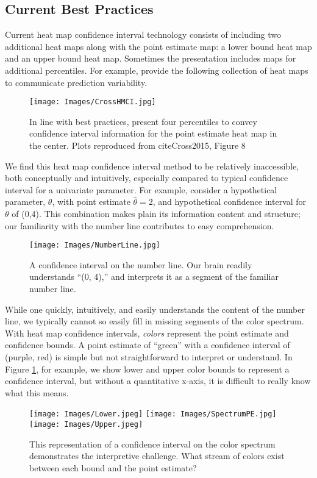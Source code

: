 \subsection{Current Best Practices}

Current heat map confidence interval technology consists of including two additional heat maps along with the point estimate map: a lower bound heat map and an upper bound heat map. Sometimes the presentation includes maps for additional percentiles. For example, \cite{Cross2015} provide the following collection of heat maps to communicate prediction variability.
  \begin{figure}[H]
	\texttt{[image: Images/CrossHMCI.jpg]}
	\caption{In line with best practices, \cite{Cross2015} present four percentiles to convey confidence interval information for the point estimate heat map in the center. Plots reproduced from cite{Cross2015}, Figure 8}
	\end{figure}
We find this heat map confidence interval method to be relatively inaccessible, both conceptually and intuitively, especially compared to typical confidence interval for a univariate parameter. For example, consider a hypothetical parameter, $\theta$, with point estimate $\hat{\theta} = 2$, and hypothetical confidence interval for $\theta$ of (0,4). This combination makes plain its information content and structure; our familiarity with the number line contributes to easy comprehension.
  \begin{figure}[H]
  \centering
	\texttt{[image: Images/NumberLine.jpg]}
	\caption{A confidence interval on the number line. Our brain readily understands ``(0, 4),'' and interprets it as a segment of the familiar number line. } %
	\end{figure}
While one quickly, intuitively, and easily understands the content of the number line, we typically cannot so easily fill in missing segments of the color spectrum. With heat map confidence intervals, {\it colors} represent the point estimate and confidence bounds. A point estimate of ``green'' with a confidence interval of (purple, red) is simple but not straightforward to interpret or understand. In Figure \ref{fig:colorCI}, for example, we show lower and upper color bounds to represent a confidence interval, but without a quantitative x-axis, it is difficult to really know what this means.
  \begin{figure}[H]
  \centering
	\texttt{[image: Images/Lower.jpeg]}
	\texttt{[image: Images/SpectrumPE.jpg]}
	\texttt{[image: Images/Upper.jpeg]}
	\caption{This representation of a confidence interval on the color spectrum demonstrates the interpretive challenge. What stream of colors exist between each bound and the point estimate?}
	\label{fig:colorCI}
	\end{figure}
